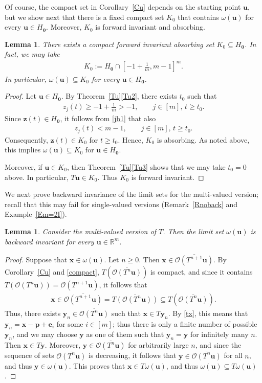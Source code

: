 \documentclass[11pt,reqno,tbtags,a4paper]{amsart}
\numberwithin{equation}{section}
\renewcommand\ge{\geq}
\renewcommand\geq{\geqslant}
\theoremstyle{plain}%
\newtheorem{lemma}[theorem]{Lemma}
\theoremstyle{definition}
\theoremstyle{remark}
\newcommand{\refT}[1]{Theorem~\ref{#1}}
\newcommand{\refC}[1]{Corollary~\ref{#1}}
\newcommand{\refR}[1]{Remark~\ref{#1}}
\newcommand{\refE}[1]{Example~\ref{#1}}
\newcommand\bbR{\mathbb R}
\newcommand\cL{{\omega}}
\newcommand\cO{\mathcal O}
\newcommand\Ho{H_{\0}}
\newcommand\ve{\mathbf{e}}
\newcommand\vp{\mathbf{p}}
\newcommand\vu{\mathbf{u}}
\newcommand\vx{\mathbf{x}}
\newcommand\vy{\mathbf{y}}
\newcommand\vz{\mathbf{z}}
\newcommand\bcO[1]{\overline{\cO(#1)}}
\newcommand\0{{\boldsymbol 0}}
\newcommand\1{{\boldsymbol 1}}
\begin{document}
Of course, the compact set in \refC{Cu} depends on the starting point $\vu$,
but we show next that there is a fixed compact set $K_0$ that contains
$\cL(\vu)$ for every $\vu \in \Ho$. 
Moreover, $K_0$ is forward invariant and absorbing.


\begin{lemma}\label{LK0}
  There exists a compact forward invariant absorbing set $K_0\subseteq \Ho$.
In fact, we may take
\begin{align}\label{jb3}
  K_0 := \Ho\cap [-1+\tfrac1m,m-1]^m.
\end{align}
In particular, $\cL(\vu)\subseteq K_0$ for every $\vu\in\Ho$.
\end{lemma}
\begin{proof}
Let $\vu\in\Ho$.
By \refT{Tu}\ref{Tu2},
there exists $t_0$ such that
\begin{align}\label{jb1}
  z_j(t) \ge -1+\frac{1}{m}>-1,
\qquad j\in[m],\, t\ge t_0.
\end{align}
Since $\vz(t)\in \Ho$, 
it follows from \eqref{jb1} that also 
\begin{align}\label{jb2}
  z_j(t) < m-1,
\qquad j\in[m],\, t\ge t_0.
\end{align}
Consequently, 
$\vz(t)\in K_0$ 
%
for $t\ge t_0$.
Hence, $K_0$ is absorbing.
As noted above, this implies $\cL(\vu)\subseteq K_0$ for $\vu\in\Ho$.

Moreover, if $\vu\in K_0$, then \refT{Tu}\ref{Tu3} shows that we may take
$t_0=0$ above. In particular, $T\vu\in K_0$.
Thus $K_0$ is forward invariant.
\end{proof}

We next prove backward invariance of the limit sets for the multi-valued
version; recall that this may fail for single-valued versions
(\refR{Rnoback} and \refE{Em=2I}).

\begin{lemma}\label{Lback}
  Consider the  multi-valued version of $T$. Then the limit set $\cL(\vu)$
  is backward invariant for every $\vu\in\bbR^m$.
\end{lemma}

\begin{proof}
Suppose that $\vx\in\cL(\vu)$. Let $n\ge0$. Then $\vx\in \bcO{T^{n+1}\vu}$.
By \refC{Cu} and \eqref{compact}, 
$T(\bcO{T^n\vu})$ is compact, and since it contains
$T(\cO(T^n\vu))=\cO(T^{n+1}\vu)$, it follows that 
\begin{align}
  \vx\in \bcO{T^{n+1}\vu}
= \overline{T(\cO(T^n\vu))}
\subseteq
T(\bcO{T^n\vu}).
\end{align}
Thus, there exists $\vy_n\in \bcO{T^n\vu}$ such that $\vx\in T\vy_n$.
By \eqref{tx}, this means that $\vy_n=\vx-\vp+\ve_i$ for some $i\in[m]$;
thus there is only a finite number of possible $\vy_n$, and we may choose
$\vy$ as one of them such that $\vy_n=\vy$ for infinitely many $n$.
Then $\vx\in T\vy$. Moreover, $\vy\in\bcO{T^n\vu}$ for arbitrarily large $n$,
and since the sequence of sets $\bcO{T^n\vu}$ is decreasing, 
it follows that $\vy\in\bcO{T^n\vu}$ for all $n$, and thus $\vy\in\cL(\vu)$.
This proves that $\vx\in T\cL(\vu)$, and thus $\cL(\vu)\subseteq T\cL(\vu)$.
\end{proof}
\end{document}
